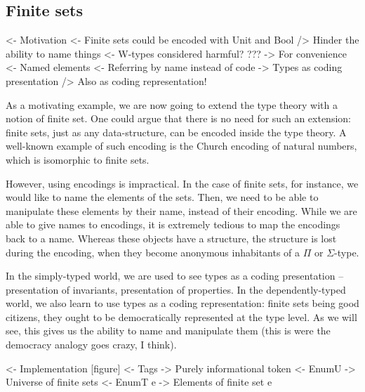 \subsection{Finite sets}
\label{sec:finite-sets}

\begin{wstructure}
<- Motivation
    <- Finite sets could be encoded with Unit and Bool
        /> Hinder the ability to name things
    <- W-types considered harmful?
        ???
    -> For convenience
        <- Named elements
        <- Referring by name instead of code
        -> Types as coding presentation
            /> Also as coding representation!
\end{wstructure}

As a motivating example, we are now going to extend the type theory
with a notion of finite set. One could argue that there is no need for
such an extension: finite sets, just as any data-structure, can be
encoded inside the type theory. A well-known example of such encoding
is the Church encoding of natural numbers, which is isomorphic to
finite sets. 

However, using encodings is impractical. In the case of finite sets,
for instance, we would like to name the elements of the sets. Then, we
need to be able to manipulate these elements by their name, instead of
their encoding. While we are able to give names to encodings, it is
extremely tedious to map the encodings back to a name. Whereas these
objects have a structure, the structure is lost during the encoding,
when they become anonymous inhabitants of a $\Pi$ or $\Sigma$-type.

In the simply-typed world, we are used to see types as a coding
presentation -- presentation of invariants, presentation of
properties. In the dependently-typed world, we also learn to use types
as a coding representation: finite sets being good citizens, they
ought to be democratically represented at the type level. As we will
see, this gives us the ability to name and manipulate them (this is
were the democracy analogy goes crazy, I think).

\begin{wstructure}
<- Implementation [figure]      
    <- Tags
        -> Purely informational token
    <- EnumU
        -> Universe of finite sets
    <- EnumT e
        -> Elements of finite set e
\end{wstructure}

